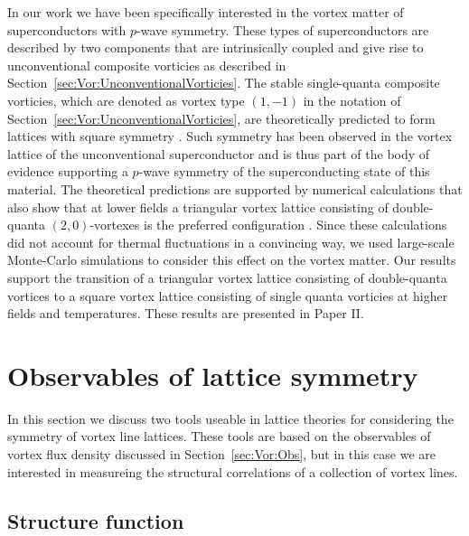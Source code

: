 In our work we have been specifically interested in the vortex matter of superconductors with $p$-wave symmetry. These types of superconductors are described by two components that are intrinsically
coupled and give rise to unconventional composite vorticies as described in Section~\ref{sec:Vor:UnconventionalVorticies}. The stable single-quanta composite vorticies, which are denoted
as vortex type $(1, -1)$ in the notation of Section~\ref{sec:Vor:UnconventionalVorticies}, are theoretically predicted to form lattices with square symmetry \cite{Agterberg00,Heeb99,AgterbergVortex98}.
Such symmetry has been observed in the vortex lattice of the unconventional superconductor  \cite{Riseman98,Aegerter98,Ray14,Curran11} and is thus part of the body of evidence
supporting a $p$-wave symmetry of the superconducting state of this material. The theoretical predictions are supported by numerical calculations that also show that at lower fields
a triangular vortex lattice consisting of double-quanta $(2,0)$-vortexes is the preferred configuration \cite{AsleGaraud16}. Since these calculations did not account for thermal fluctuations in
a convincing way, we used large-scale Monte-Carlo simulations to consider this effect on the vortex matter. Our results support the transition of a triangular vortex lattice consisting of
double-quanta vortices to a square vortex lattice consisting of single quanta vorticies at higher fields and temperatures. These results are presented in Paper II.

\section{Observables of lattice symmetry}
\label{sec:Vor:Symm}

In this section we discuss two tools useable in lattice theories for considering the symmetry of vortex line lattices. These tools are based on the observables of vortex flux density discussed
in Section~\ref{sec:Vor:Obs}, but in this case we are interested in measureing the structural correlations of a collection of vortex lines.

\subsection{Structure function}
\label{sec:Vor:Symm:SF}

